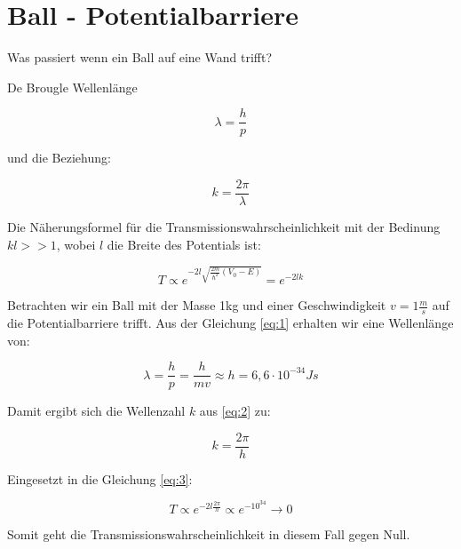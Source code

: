 



\section*{Ball - Potentialbarriere}

Was passiert wenn ein Ball auf eine Wand trifft?

De Brougle Wellenlänge

\begin{equation} 
\label{eq:1}
\lambda = \frac{h}{p}  
\end{equation}

und die Beziehung:

\begin{equation} 
\label{eq:2}
k=\frac{2\pi}{\lambda}
\end{equation}

Die Näherungsformel für die Transmissionswahrscheinlichkeit mit der Bedinung \( kl>>1 \), wobei \(l\) die Breite des Potentials ist:

\begin{equation} 
\label{eq:3}
T\propto e^{-2l\sqrt{\frac{2m}{\hbar^2}(V_0-E)}} = e^{-2lk} 
\end{equation}

Betrachten wir ein Ball mit der Masse 1kg und einer Geschwindigkeit \(v=1\frac{m}{s}\) auf die Potentialbarriere trifft. Aus der Gleichung \eqref{eq:1} erhalten wir eine Wellenlänge von:

\begin{equation}
  \label{eq:4}
  \lambda = \frac{h}{p} = \frac{h}{mv} \approx h=6,6\cdot 10^{-34} Js
\end{equation}

Damit ergibt sich die Wellenzahl \(k\) aus \eqref{eq:2} zu:

\begin{equation}
  \label{eq:5}
  k=\frac{2\pi}{h}
\end{equation}

Eingesetzt in die Gleichung \eqref{eq:3}:

\begin{equation} 
\label{eq:6}
T\propto e^{-2l\frac{2\pi}{h} }\propto e^{-10^{34}}\rightarrow 0 
\end{equation}

Somit geht die Transmissionswahrscheinlichkeit in diesem Fall gegen Null.






